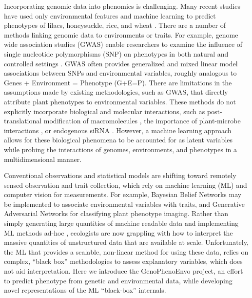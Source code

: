 \documentclass[12pt,]{article}
\begin{document}
Incorporating genomic data into phenomics is challenging. Many recent
studies have used only environmental features and machine learning to
predict phenotypes of lilacs, honeysuckle, rice, and wheat
\citep{ALDERMAN20171, nissanka2015calibration, mehdipoor2019geocomputational}.
There are a number of methods linking genomic data to environments or
traits. For example, genome wide association studies (GWAS) enable
researchers to examine the influence of single nucleotide polymorphisms
(SNP) on phenotypes in both natural and controlled settings
\citep{beyer2019loci, schlappi2017assessment, spindel2016genome}. GWAS
often provides generalized and mixed linear model associations between
SNPs and environmental variables, roughly analogous to Genes +
Environment = Phenotype (G+E=P). There are limitations in the
assumptions made by existing methodologies, such as GWAS, that directly
attribute plant phenotypes to environmental variables. These methods do
not explicitly incorporate biological and molecular interactions, such
as post-translational modification of macromolecules
\citep{running2014role}, the importance of plant-microbe interactions
\citep{oyserman2019extracting}, or endogenous siRNA
\citep{katiyar2006pathogen}. However, a machine learning approach allows
for these biological phenomena to be accounted for as latent variables
while probing the interactions of genomes, environments, and phenotypes
in a multidimensional manner.

Conventional observations and statistical models are shifting toward
remotely sensed observation and trait collection, which rely on machine
learning (ML) and computer vision for measurements. For example,
Bayesian Belief Networks \citep{cooper1990computational} may be
implemented to associate environmental variables with traits, and
Generative Adversarial Networks \citep{radford2015unsupervised} for
classifying plant phenotype imaging. Rather than simply generating large
quantities of machine readable data \citep{hampton2013big} and
implementing ML methods ad-hoc \citep{pichler2020machine}, ecologists
are now grappling with how to interpret the massive quantities of
unstructured data that are available at scale. Unfortunately, the ML
that provides a scalable, non-linear method for using these data, relies
on complex, ``black box'' methodologies to assess explanatory variables,
which does not aid interpretation. Here we introduce the GenoPhenoEnvo
project, an effort to predict phenotype from genetic and environmental
data, while developing novel representations of the ML ``black-box''
internals.
\end{document}
